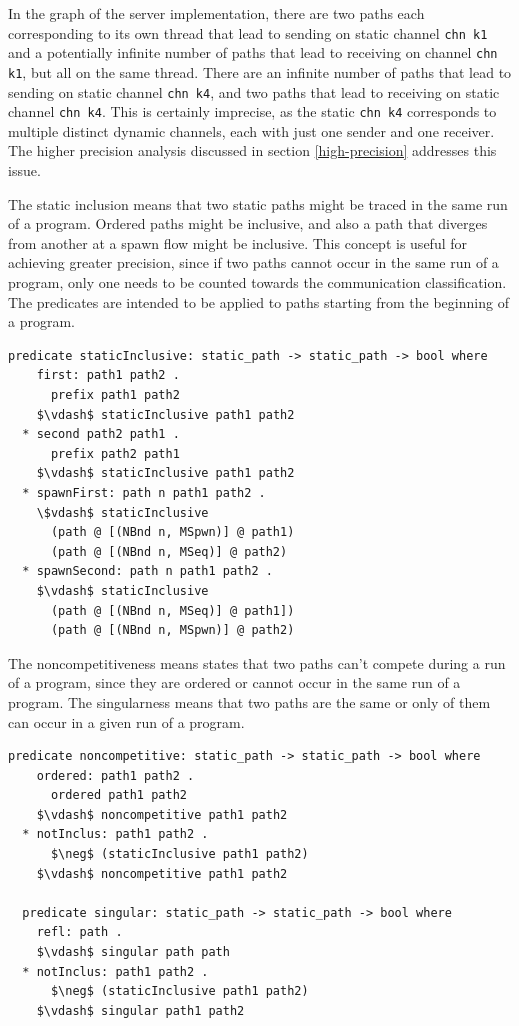 \documentclass[letterpaper, 11pt]{extarticle}
\begin{document}
In the graph of the server implementation, there are two paths each corresponding to its
own thread that lead
to sending on
static channel \lstinline[language=sugar_lang]{chn k1} and a potentially infinite number of
paths that lead to receiving on
channel \lstinline[language=sugar_lang]{chn k1}, but all on the same thread.
There are an infinite number of paths that lead
to sending on static channel \lstinline[language=sugar_lang]{chn k4}, and two paths
that lead to receiving on static channel
\lstinline[language=sugar_lang]{chn k4}. This is certainly imprecise,
as the static \lstinline[language=sugar_lang]{chn k4} corresponds to
multiple distinct dynamic channels, each with just one sender and one receiver. The higher
precision analysis discussed in section \ref{high-precision} addresses this issue.

The static inclusion means that two static paths might be traced in
the same run of a program. Ordered paths might be inclusive, and also a path that diverges
from another at a spawn flow might be inclusive. This concept is useful for achieving
greater precision, since if two paths cannot occur in the same run of a program, only one needs
to be counted towards the communication classification. The predicates are intended to be applied
to paths starting from the beginning of a program.

\begin{lstlisting}[language=logic, mathescape]
  predicate staticInclusive: static_path -> static_path -> bool where
    first: path1 path2 .
      prefix path1 path2
    $\vdash$ staticInclusive path1 path2
  * second path2 path1 .
      prefix path2 path1
    $\vdash$ staticInclusive path1 path2
  * spawnFirst: path n path1 path2 .
    \$vdash$ staticInclusive
      (path @ [(NBnd n, MSpwn)] @ path1)
      (path @ [(NBnd n, MSeq)] @ path2)
  * spawnSecond: path n path1 path2 .
    $\vdash$ staticInclusive
      (path @ [(NBnd n, MSeq)] @ path1])
      (path @ [(NBnd n, MSpwn)] @ path2)
\end{lstlisting}

The noncompetitiveness means states that two paths can't compete during a run of a
program, since they are ordered or cannot occur in the same run of a program.
The singularness means that two paths are the same or only of them can occur in a given run of
a program. 

\begin{lstlisting}[language=logic, mathescape]
  predicate noncompetitive: static_path -> static_path -> bool where
    ordered: path1 path2 .
      ordered path1 path2
    $\vdash$ noncompetitive path1 path2
  * notInclus: path1 path2 .
      $\neg$ (staticInclusive path1 path2)
    $\vdash$ noncompetitive path1 path2

  predicate singular: static_path -> static_path -> bool where
    refl: path .
    $\vdash$ singular path path
  * notInclus: path1 path2 .
      $\neg$ (staticInclusive path1 path2)
    $\vdash$ singular path1 path2
\end{lstlisting}
\end{document}
